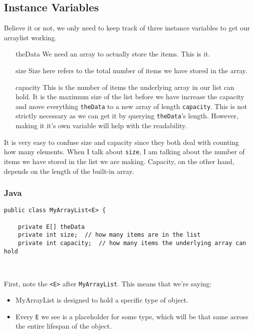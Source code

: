 
\subsection{Instance Variables}

Believe it or not, we only need to keep track of three instance variables to get our arraylist working.

\begin{enumerate}
	\item[theData]  We need an array to actually store the items.  This is it.
	\item[size] Size here refers to the total number of items we have stored in the array.
	\item[capacity]  This is the number of items  the underlying array in our list can hold. It is the maximum size of the list before we have increase the capacity  and move everything \texttt{theData} to a new array of length \texttt{capacity}.   This is not strictly necessary as we can get it by querying \texttt{theData}'s length. However, making it it's own variable will help with the readability.
\end{enumerate}

It is very easy to confuse size and capacity since they both deal with counting how many elements.  When I talk about \texttt{size}, I am talking about the number of items we have stored in the list we are making.  Capacity, on the other hand, depends on the length of the built-in array. 

\subsubsection{Java}


\begin{verbatim}
public class MyArrayList<E> {
	
	private E[] theData
	private int size;  // how many items are in the list
	private int capacity;  // how many items the underlying array can hold
	
	
\end{verbatim}

First, note the \texttt{<E>} after \texttt{MyArrayList}.  This means that we're saying:
\begin{itemize}
	\item MyArrayList is designed to hold a specific type of object.
	\item Every \texttt{E} we see is a placeholder for some type, which will be that same across the entire lifespan of the object.
\end{itemize}


